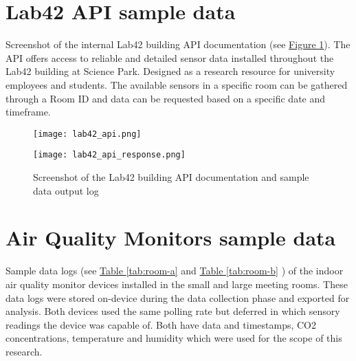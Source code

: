 \begin{appendices}
\section{Lab42 API sample data}
\label{appendix:api-sample-data}

Screenshot of the internal Lab42 building API documentation (see \hyperref[fig:api-documentation]{Figure \ref{fig:api-documentation}}). The API offers access to reliable and detailed sensor data installed throughout the Lab42 building at Science Park. Designed as a research resource for university employees and students. The available sensors in a specific room can be gathered through a Room ID and data can be requested based on a specific date and timeframe.


\begin{figure}[H]
    \centering
    \begin{minipage}{0.7\textwidth}
        \centering
        \texttt{[image: lab42\_api.png]}
    \end{minipage}%
    \begin{minipage}{0.3\textwidth}
        \centering
        \texttt{[image: lab42\_api\_response.png]}
    \end{minipage}
    \caption{Screenshot of the Lab42 building API documentation and sample data output log}
    \label{fig:api-documentation}
\end{figure}

\newpage

\section{Air Quality Monitors sample data}
\label{appendix:monitors}

Sample data logs (see \hyperref[tab:room-a]{Table \ref{tab:room-a}} and \hyperref[tab:room-b]{Table \ref{tab:room-b}} ) of the indoor air quality monitor devices installed in the small and large meeting rooms. These data logs were stored on-device during the data collection phase and exported for analysis. Both devices used the same polling rate but deferred in which sensory readings the device was capable of. Both have data and timestamps, CO2 concentrations, temperature and humidity which were used for the scope of this research.


\end{appendices}
